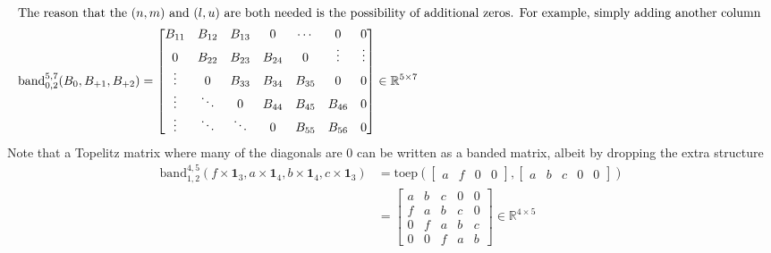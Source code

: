 \documentclass[11pt]{article}
\newcommand{\R}{\ensuremath{\mathbb{R}}}
\newcommand{\band}{\ensuremath{\mathrm{band}}}
\newcommand{\toep}{\ensuremath{\mathrm{toep}}}
\theoremstyle{definition}
\begin{document}
\begin{align}
\intertext{The reason that the $(n,m)$ and $(l,u)$ are both needed is the possibility of additional zeros.  For example, simply adding another column }
\band_{0,2}^{5,7}(B_{0}, B_{+1}, B_{+2}) &= \begin{bmatrix}
 B_{11} & B_{12} & B_{13} & 0      & \cdots & 0  & 0 \\
 0 & B_{22} & B_{23} & B_{24} &0 & \vdots & \vdots \\
  \vdots      & 0 & B_{33} & B_{34} & B_{35} & 0 & 0 \\
 \vdots & \ddots & 0 & B_{44} & B_{45} & B_{46} & 0\\
 \vdots & \ddots & \ddots & 0 & B_{55} & B_{56} & 0
\end{bmatrix}\in \R^{5\times 7}
\end{align}
Note that a Topelitz matrix where many of the diagonals are $0$ can be written as a banded matrix, albeit by dropping the extra structure
\begin{align}
\band_{1,2}^{4,5}\left(f\times \mathbf{1}_3, a\times \mathbf{1}_4, b\times \mathbf{1}_4, c\times \mathbf{1}_3\right)
   &= \toep(\begin{bmatrix}a & f & 0 & 0 \end{bmatrix},\begin{bmatrix}a & b & c & 0 & 0 \end{bmatrix}) \\
   &= \begin{bmatrix}
	a & b & c & 0 & 0 \\
	f & a & b & c & 0 \\
	0 & f & a & b & c \\
	0 & 0 & f & a & b
	\end{bmatrix} \in \R^{4 \times 5}\\
\end{align}
\end{document}
